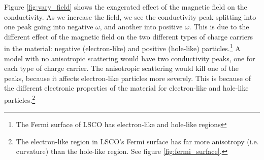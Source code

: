 Figure \ref{fig:vary_field} shows the exagerated effect of the magnetic field on the conductivity.
As we increase the field, we see the conductivity peak splitting into one peak going into negative
$\omega$, and another into positive $\omega$. This is due to the different effect of the magnetic
field on the two different types of charge carriers in the material: negative (electron-like)
and positive (hole-like) particles.\footnote{The Fermi surface of LSCO has electron-like
and hole-like regions} A model with no anisotropic scattering would have two conductivity peaks,
one for each type of charge carrier. The anisotropic scattering would kill one of the peaks,
because it affects electron-like particles more severely. This is because of the different
electronic properties of the material for electron-like and hole-like particles.\footnote{
The electron-like region in LSCO's Fermi surface has far more anisotropy (i.e. curvature)
than the hole-like region. See figure \ref{fig:fermi_surface}.}

